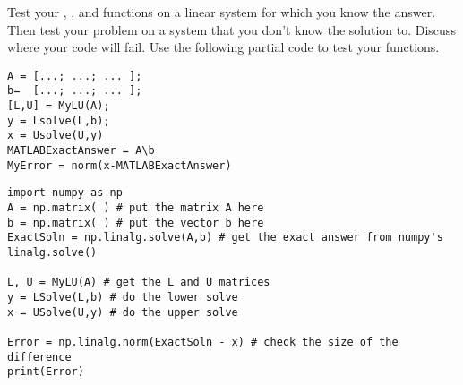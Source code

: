 \begin{problem}
    Test your , , and  functions on a linear
    system for which you know the answer.  Then test your problem on a system
    that you don't know the solution to.  Discuss where your code will fail. Use the
    following partial code to test your functions.

\bcode
\ifnum{}
\begin{lstlisting}
A = [...; ...; ... ];
b=  [...; ...; ... ];
[L,U] = MyLU(A);
y = Lsolve(L,b);
x = Usolve(U,y)
MATLABExactAnswer = A\b
MyError = norm(x-MATLABExactAnswer)
\end{lstlisting}
\else
\begin{lstlisting}
import numpy as np
A = np.matrix( ) # put the matrix A here
b = np.matrix( ) # put the vector b here
ExactSoln = np.linalg.solve(A,b) # get the exact answer from numpy's linalg.solve()

L, U = MyLU(A) # get the L and U matrices
y = LSolve(L,b) # do the lower solve
x = USolve(U,y) # do the upper solve

Error = np.linalg.norm(ExactSoln - x) # check the size of the difference
print(Error)
\end{lstlisting}
\fi
\end{problem}



